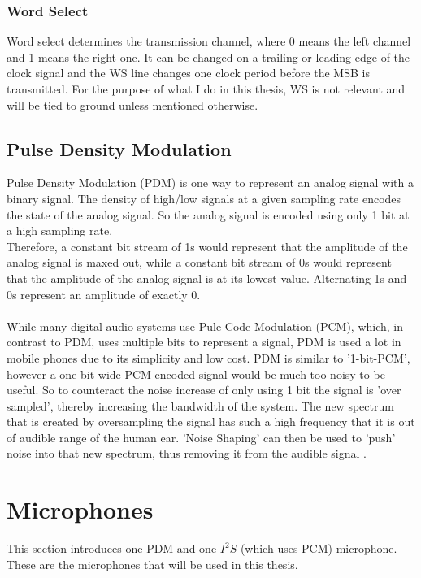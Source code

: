 \subsubsection{Word Select}

Word select determines the transmission channel, where 0 means the left channel and 1 means the right one.
It can be changed on a trailing or leading edge of the clock signal and the WS line changes one clock period
before the MSB is transmitted.
For the purpose of what I do in this thesis, WS is not relevant and will be tied to ground unless mentioned otherwise.

\subsection{Pulse Density Modulation}

Pulse Density Modulation (PDM) is one way to represent an analog signal with a binary signal.
The density of high/low signals at a given sampling rate encodes the state of the analog signal.
So the analog signal is encoded using only 1 bit at a high sampling rate.\\
Therefore, a constant bit stream of 1s would represent that the amplitude of the analog signal is maxed out,
while a constant bit stream of 0s would represent that the amplitude of the analog signal is at its lowest value.
Alternating 1s and 0s represent an amplitude of exactly 0.\\\\
While many digital audio systems use Pule Code Modulation (PCM), which, in contrast to PDM, uses multiple bits to represent a signal,
PDM is used a lot in mobile phones \cite{pdm_utexas} due to its simplicity and low cost.
PDM is similar to '1-bit-PCM', however a one bit wide PCM encoded signal would be much too noisy to be useful.
So to counteract the noise increase of only using 1 bit the signal is 'over sampled', thereby increasing the bandwidth of the system.
The new spectrum that is created by oversampling the signal has such a high frequency that it is out of audible range of the human ear.
'Noise Shaping' can then be used to 'push' noise into that new spectrum, thus removing it from the audible signal \cite{pdm_texas}.

\section{Microphones}

This section introduces one PDM and one $I^2S$ (which uses PCM) microphone.
These are the microphones that will be used in this thesis.

